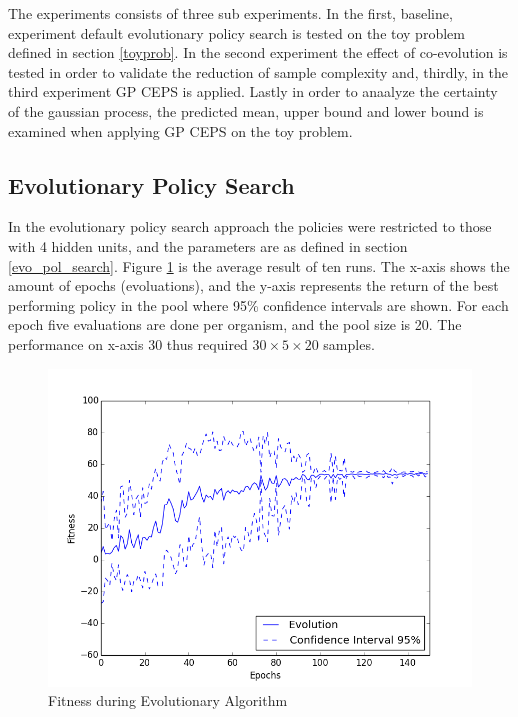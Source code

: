 The experiments consists of three sub experiments. In the first, baseline, experiment default evolutionary policy search is tested on the toy problem defined in section \ref{toyprob}. In the second experiment the effect of co-evolution is tested in order to validate the reduction of sample complexity and, thirdly, in the third experiment GP CEPS is applied. Lastly in order to anaalyze the certainty of the gaussian process, the predicted mean, upper bound and lower bound is examined when applying GP CEPS on the toy problem.

\subsection{Evolutionary Policy Search}

In the evolutionary policy search approach the policies were restricted to those with 4 hidden units, and the parameters are as defined in section \ref{evo_pol_search}. Figure \ref{Fitness during Evolutionary Algorithm} is the average result of ten runs. The x-axis shows the amount of epochs (evoluations), and the y-axis represents the return of the best performing policy in the pool where 95\% confidence intervals are shown. For each epoch five evaluations are done per organism, and the pool size is 20. The performance on x-axis $30$ thus required $30 \times 5 \times 20$ samples. %

\begin{figure}[ht]
  \centering
  \includegraphics[scale=0.5]{images/evo.png}
  \caption{Fitness during Evolutionary Algorithm}\label{Fitness during Evolutionary Algorithm}
\end{figure}

